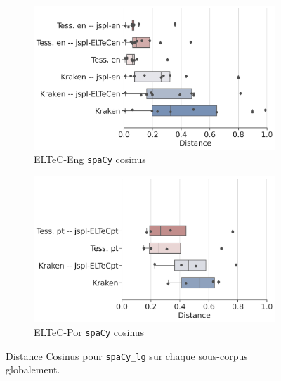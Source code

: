\begin{figure}[h!]
    \begin{subfigure}{0.45\textwidth}
  \includegraphics[height=.65\textwidth]{IMAGES/Boite-moustache/ELTeC-Eng_spacy3.5.1_cosinus.png}
        \caption{ELTeC-Eng \texttt{spaCy} cosinus}
   \end{subfigure}
    \begin{subfigure}{0.5\textwidth}
  \includegraphics[height=.65\textwidth]{IMAGES/Boite-moustache/ELTeC-Por_spaCy3.5.1_cosinus.png} 
        \caption{ELTeC-Por \texttt{spaCy} cosinus} 
         \label{fig:ELTeC-Por-spaCy-cosinus}
   \end{subfigure}
   
    \caption{Distance Cosinus pour \texttt{spaCy\_lg} sur chaque sous-corpus globalement.}
\label{fig:Cosinus-spacy-lg}
\end{figure}


